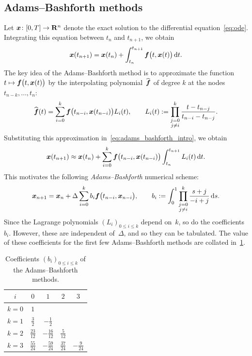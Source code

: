 \subsection{Adams--Bashforth methods}
Let $\mathbf{\boldsymbol{x}}\colon [0, T] \to \mathbf R^n$ denote the exact solution to the differential equation~\eqref{eq:ode}.
Integrating this equation between $t_n$ and $t_{n+1}$,
we obtain
\begin{equation}
    \label{eq:adams_bashforth_intro}
    \mathbf{\boldsymbol{x}}(t_{n+1}) = \mathbf{\boldsymbol{x}}(t_n) + \int_{t_n}^{t_{n+1}} \mathbf{\boldsymbol{f}}\bigl(t, \mathbf{\boldsymbol{x}}(t)\bigr) \, \mathrm d t.
\end{equation}
The key idea of the Adams--Bashforth method is to approximate the function $t \mapsto \mathbf{\boldsymbol{f}}\bigl(t, \mathbf{\boldsymbol{x}}(t)\bigr)$ by the interpolating polynomial~$\widehat {\mathbf{\boldsymbol{f}}}$ of degree $k$ at the nodes
$t_{n-k}, \dotsc, t_n$:
\begin{equation}
    \label{eq:interpolation}
    \widehat {\mathbf{\boldsymbol{f}}}(t) = \sum_{i=0}^{k} \mathbf{\boldsymbol{f}}\bigl(t_{n-i}, \mathbf{\boldsymbol{x}}(t_{n-i})\bigr) L_i(t),
    \qquad L_i(t) := \prod_{\substack{j=0 \\ j\neq i}}^{k} \frac{t - t_{n-j}}{t_{n-i} - t_{n-j}}.
\end{equation}
Substituting this approximation in~\eqref{eq:adams_bashforth_intro},
we obtain
\[
    \mathbf{\boldsymbol{x}}(t_{n+1}) \approx \mathbf{\boldsymbol{x}}(t_n) + \sum_{i=0}^{k} \mathbf{\boldsymbol{f}}\bigl(t_{n-i}, \mathbf{\boldsymbol{x}}(t_{n-i})\bigr) \int_{t_n}^{t_{n+1}} L_i(t)\, \mathrm d t.
\]
This motivates the following \emph{Adams--Bashforth} numerical scheme:
\begin{equation}
    \label{eq:adams_bashforth}
    \mathbf{\boldsymbol{x}}_{n+1} = \mathbf{\boldsymbol{x}}_n + \Delta \sum_{i=0}^{k} b_i \mathbf{\boldsymbol{f}}\bigl(t_{n-i}, \mathbf{\boldsymbol{x}}_{n-i}\bigr),
    \qquad b_i := \int_{0}^{1} \prod_{\substack{j=0 \\ j\neq i}}^{k} \frac{s + j}{-i + j} \, \mathrm d s.
\end{equation}
Since the Lagrange polynomials $(L_i)_{0\leq i\leq k}$ depend on~$k$,
so do the coefficients $b_i$.
However, these are independent of~$\Delta$,
and so they can be tabulated.
The value of these coefficients for the first few Adams--Bashforth methods are collated in~\cref{table:adams_bashforth}.

\begin{table}[ht]
    \centering
    \begin{tabular}{|c|c|c|c|c|}
         \hline \phantom{$\Big($}
             $i$ & $0$ & $1$ & $2$ & $3$
         \\ \hline \phantom{$\Big($}
             $k=0$ & $1$ & & &
         \\ \hline \phantom{$\Big($}
             $k=1$ & $\frac{3}{2}$ & $-\frac{1}{2}$ & &
         \\ \hline \phantom{$\Big($}
             $k=2$ & $\frac{23}{12}$ & $-\frac{16}{12}$ & $\frac{5}{12}$ &
         \\ \hline \phantom{$\Big($}
             $k=3$ & $\frac{55}{24}$ & $-\frac{59}{24}$ & $\frac{37}{24}$ & $-\frac{9}{24}$
         \\ \hline
    \end{tabular}
    \caption{%
        Coefficients $(b_i)_{0 \leq i \leq k}$ of the Adams--Bashforth methods.
    }
    \label{table:adams_bashforth}
\end{table}

